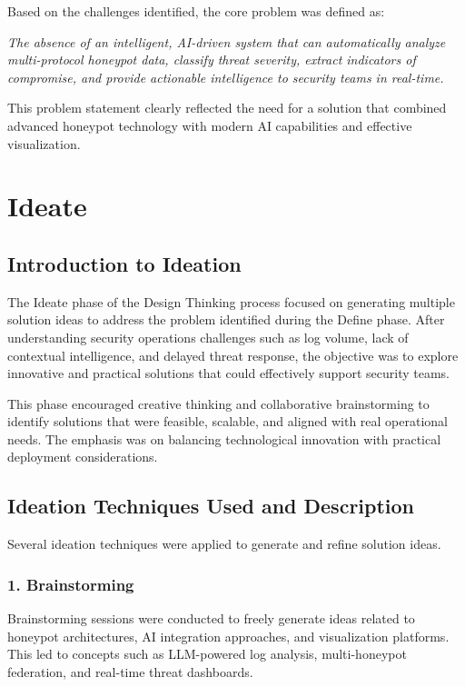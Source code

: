 \documentclass[12pt,a4paper]{report}
\begin{document}
Based on the challenges identified, the core problem was defined as:

\textit{The absence of an intelligent, AI-driven system that can automatically analyze multi-protocol honeypot data, classify threat severity, extract indicators of compromise, and provide actionable intelligence to security teams in real-time.}

This problem statement clearly reflected the need for a solution that combined advanced honeypot technology with modern AI capabilities and effective visualization.


\chapter{Ideate}
\thispagestyle{fancy}

\section{Introduction to Ideation}

The Ideate phase of the Design Thinking process focused on generating multiple solution ideas to address the problem identified during the Define phase. After understanding security operations challenges such as log volume, lack of contextual intelligence, and delayed threat response, the objective was to explore innovative and practical solutions that could effectively support security teams.

This phase encouraged creative thinking and collaborative brainstorming to identify solutions that were feasible, scalable, and aligned with real operational needs. The emphasis was on balancing technological innovation with practical deployment considerations.

\section{Ideation Techniques Used and Description}

Several ideation techniques were applied to generate and refine solution ideas.

\subsection*{1. Brainstorming}

Brainstorming sessions were conducted to freely generate ideas related to honeypot architectures, AI integration approaches, and visualization platforms. This led to concepts such as LLM-powered log analysis, multi-honeypot federation, and real-time threat dashboards.
\end{document}
